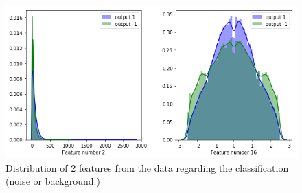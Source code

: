 \documentclass[10pt,conference,compsocconf]{IEEEtran}
\begin{document}
\begin{figure}[tbp]
  \centering
  \includegraphics[width=\columnwidth]{dist_plot.png}
  \caption{Distribution of 2 features from the data regarding the classification (noise or background.)}
  \vspace{-3mm}
  \label{fig:denoise-fourier}
\end{figure}
\end{document}
